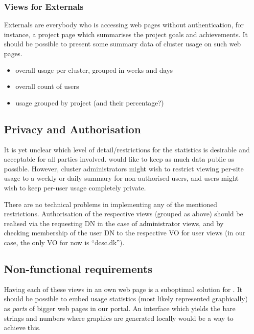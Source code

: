 \subsubsection*{Views for Externals}

Externals are everybody who is accessing \griddk{}  web pages without
authentication, for instance, a project page which summarises the
project goals and achievements. It should be possible to present some
summary data of cluster usage on such web pages.

\begin{itemize}
  \item overall usage per cluster, grouped in weeks and days
  \item overall count of users 
  \item usage grouped by project (and their percentage?)
\end{itemize}

\subsection*{Privacy and Authorisation}

It is yet unclear which level of detail/restrictions for the
statistics is desirable and acceptable for all parties involved.
\griddk{} would like to keep as much data public as possible. However,
cluster administrators might wish to restrict viewing per-site usage
to a weekly or daily summary for non-authorised users, and users might
wish to keep per-user usage completely private.

There are no technical problems in implementing any of the mentioned
restrictions. Authorisation of the respective views (grouped as
above) should be realised via the requesting DN in the case of
administrator views, and by checking membership of the user DN to the
respective VO for user views (in our case, the only VO for now is
``dcsc.dk'').

\subsection*{Non-functional requirements}

Having each of these views in an own web page is a suboptimal solution
for \griddk{}. It should be possible to embed usage statistics (most
likely represented graphically) as \emph{parts} of bigger web pages in
our portal. An interface which yields the bare strings and numbers
where graphics are generated locally would be a way to achieve this.

